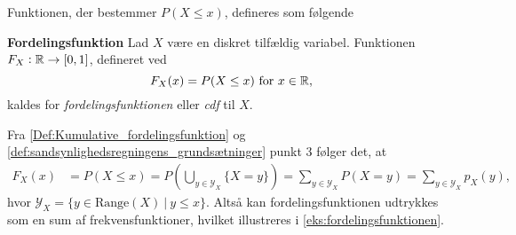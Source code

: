 





Funktionen, der bestemmer $P(X \leq x)$, defineres som følgende


\begin{minipage}\textwidth
\begin{defn}\textbf{Fordelingsfunktion}\label{Def:Kumulative_fordelingsfunktion} %
\newline
Lad $X$ være en diskret tilfældig variabel. Funktionen $F_X:\mathbb{R} \to [0,1]$, defineret ved
$$F_X(x)=P(X\leq x) \text{ for } x\in\mathbb{R},$$
kaldes for \textit{fordelingsfunktionen} eller \textit{cdf} til $X$.
\end{defn}
\end{minipage}

Fra \autoref{Def:Kumulative_fordelingsfunktion} og \autoref{def:sandsynlighedsregningens_grundsætninger} punkt 3 følger det, at
%
\begin{align}
    F_X(x) &= P\left(X\leq x\right)=P\left(\bigcup_{y\in \mathcal{Y}_X} \{X=y\}\right) = \sum_{y\in \mathcal{Y}_X} P(X=y) = \sum_{y\in \mathcal{Y}_X} p_X(y), \label{eq:fordelingsfunktion_som_sum_af_frekvensfunktioner}
\end{align}
hvor $\mathcal{Y}_X = \{y\in \text{Range}(X) \ | \ y\leq x\}$.
%
Altså kan fordelingsfunktionen udtrykkes som en sum af frekvensfunktioner, hvilket illustreres i \autoref{eks:fordelingsfunktionen}.



